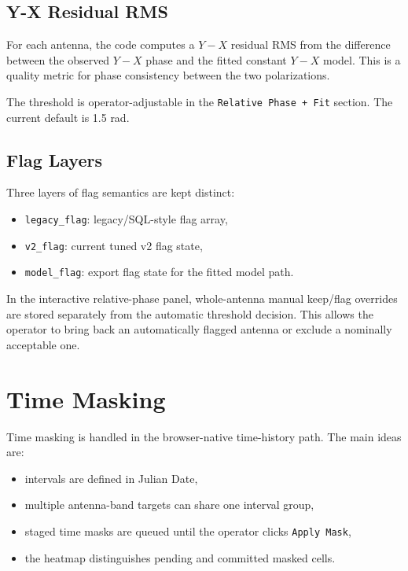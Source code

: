 \documentclass[11pt]{article}
\begin{document}
\subsection{Y-X Residual RMS}

For each antenna, the code computes a $Y-X$ residual RMS from the difference
between the observed $Y-X$ phase and the fitted constant $Y-X$ model. This is a
quality metric for phase consistency between the two polarizations.

The threshold is operator-adjustable in the \texttt{Relative Phase + Fit}
section. The current default is 1.5 rad.

\subsection{Flag Layers}

Three layers of flag semantics are kept distinct:
\begin{itemize}[leftmargin=1.5em]
  \item \texttt{legacy\_flag}: legacy/SQL-style flag array,
  \item \texttt{v2\_flag}: current tuned v2 flag state,
  \item \texttt{model\_flag}: export flag state for the fitted model path.
\end{itemize}

In the interactive relative-phase panel, whole-antenna manual keep/flag
overrides are stored separately from the automatic threshold decision. This
allows the operator to bring back an automatically flagged antenna or exclude a
nominally acceptable one.

\section{Time Masking}

Time masking is handled in the browser-native time-history path. The main ideas
are:
\begin{itemize}[leftmargin=1.5em]
  \item intervals are defined in Julian Date,
  \item multiple antenna-band targets can share one interval group,
  \item staged time masks are queued until the operator clicks
  \texttt{Apply Mask},
  \item the heatmap distinguishes pending and committed masked cells.
\end{itemize}
\end{document}
